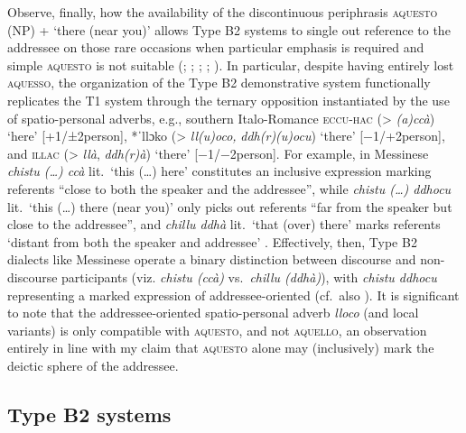 \documentclass[output=paper]{langsci/langscibook}
\begin{document}
Observe, finally, how the availability of the discontinuous periphrasis
\textsc{aquesto} (NP) + ‘there (near you)’ allows Type B2 systems to
single out reference to the addressee on those rare occasions when particular
emphasis is required and simple \textsc{aquesto} is not suitable
(\citealt[74]{Parascandola:1976a}; \citealt[258]{Vann:1995a};
\citealt[102f]{ledgeway2004sviluppo}; \citealt[211]{Ledgeway:2009a};
\citealt[§5]{Jungbluth:2017a}). In particular, despite having
entirely lost \textsc{aquesso}, the organization of the Type B2
demonstrative system functionally replicates the T1 system through the ternary
opposition instantiated by the use of spatio-personal adverbs, e.g., southern
Italo-Romance \textsc{eccu-hac} (> \emph{(a)ccà}) ‘here’ [+1/±2person], *ˈllɔko
(> \emph{ll(u)oco,} \emph{ddh(r)(u)ocu}) ‘there’ [−1/+2person], and
\textsc{illac} (> \emph{llà}, \emph{ddh(r)à}) ‘there’
[−1/−2person]. For example, in Messinese \emph{chistu
(\dots{}) ccà} lit.\ ‘this (\dots{}) here’ constitutes an inclusive expression
marking referents \enquote{close to both the speaker and the addressee}, while
\emph{chistu (\dots{}) ddhocu} lit.\ ‘this (\dots{}) there (near you)’ only
picks out referents \enquote{far from the speaker but close to the addressee},
and \emph{chillu ddhà} lit.\ ‘that (over) there’ marks referents ‘distant from
both the speaker and addressee’ \citep[30]{Quartarone:1998a}. Effectively,
then, Type B2 dialects like Messinese operate a binary distinction
between discourse and non-discourse participants (viz. \emph{chistu (ccà)} vs.\
\emph{chillu (ddhà)}), with \emph{chistu ddhocu} representing a marked
expression of ad\-dres\-see-orien\-ted \isi{deixis} (cf.\
also \citealt[76f]{Stavinschi:2009a}). It is significant to note that the
addressee-oriented spatio-personal adverb \emph{lloco} (and local variants) is
only compatible with \textsc{aquesto}, and not \textsc{aquello}, an observation
entirely in line with my claim that \textsc{aquesto} alone may (inclusively)
mark the deictic sphere of the addressee.

\subsection{Type B2 systems}\label{sub:4.2}
\end{document}

